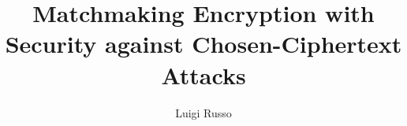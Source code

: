 \documentclass[binding=0.6cm,LaM]{sapthesis}
\title{Matchmaking Encryption with Security against Chosen-Ciphertext Attacks}
\author{Luigi Russo}
\begin{document}
\frontmatter
\maketitle
\begin{acknowledgments}
\end{acknowledgments}

\tableofcontents
\mainmatter







\backmatter

\cleardoublepage
{}
{}



\end{document}
